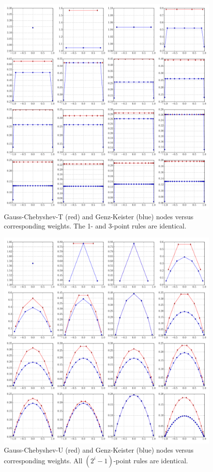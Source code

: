 \documentclass[a4paper,10pt]{article}
\begin{document}
\begin{figure}[h]
  \centering
  \includegraphics[width=\linewidth]{./img/gk_chebyshevt_nodes_1d.pdf}
  \caption{Gauss-Chebyshev-T (red) and Genz-Keister (blue) nodes versus
  corresponding weights. The 1- and 3-point rules are identical.}
  \label{fig:gk_chebyshevt_nodes_1d}
\end{figure}

\begin{figure}[h]
  \centering
  \includegraphics[width=\linewidth]{./img/gk_chebyshevu_nodes_1d.pdf}
  \caption{Gauss-Chebyshev-U (red) and Genz-Keister (blue) nodes versus
  corresponding weights. All $(2^i-1)$-point rules are identical.}
  \label{fig:gk_chebyshevu_nodes_1d}
\end{figure}
\end{document}
